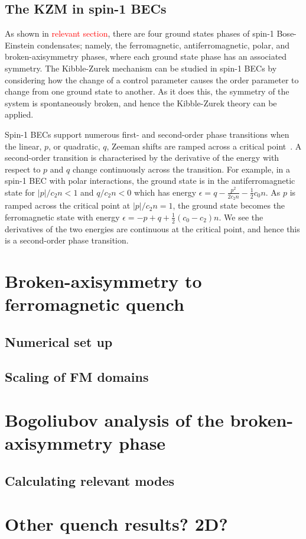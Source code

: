 \subsection{The KZM in spin-1 BECs}
As shown in \textcolor{red}{relevant section}, there are four ground states
phases of spin-1 Bose-Einstein condensates; namely, the ferromagnetic,
antiferromagnetic, polar, and broken-axisymmetry phases, where each ground
state phase has an associated symmetry.
The Kibble-Zurek mechanism can be studied in spin-1 BECs by considering how
the change of a control parameter causes the order parameter to change from 
one ground state to another.
As it does this, the symmetry of the system is spontaneously broken, and hence
the Kibble-Zurek theory can be applied.

Spin-1 BECs support numerous first- and second-order phase transitions
when the linear, $p$, or quadratic, $q$, Zeeman shifts are
ramped across a critical point~\cite{Kawaguchi2012}.
A second-order transition is characterised by the derivative of the energy with
respect to $p$ and $q$ change continuously across the transition.
For example, in a spin-1 BEC with polar interactions, the ground state is in
the antiferromagnetic state for $|p|/c_2n<1$ and $q/c_2n<0$ which has energy
$\epsilon = q - \frac{p^2}{2c_2n}-\frac{1}{2}c_0n$.
As $p$ is ramped across the critical point at $|p|/c_2n=1$, the ground state
becomes the ferromagnetic state with energy
$\epsilon = -p + q + \frac{1}{2}(c_0 - c_2)n$.
We see the derivatives of the two energies are continuous at the critical point,
and hence this is a second-order phase transition.

\section{Broken-axisymmetry to ferromagnetic quench}

\subsection{Numerical set up}
\subsection{Scaling of FM domains}

\section{Bogoliubov analysis of the broken-axisymmetry phase}
\subsection{Calculating relevant modes}

\section{Other quench results? 2D?}
